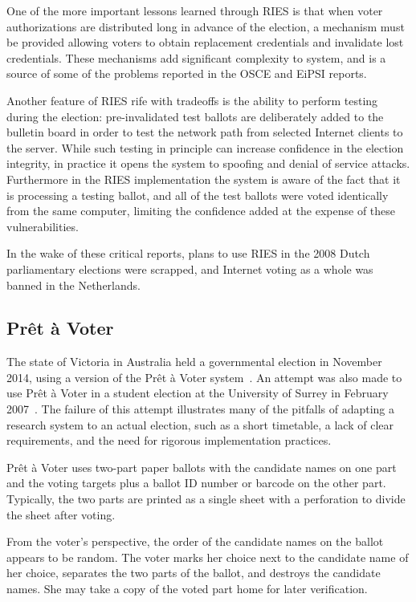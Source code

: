 One of the more important lessons learned through RIES is that when
voter authorizations are distributed long in advance of the election,
a mechanism must be provided allowing voters to obtain replacement
credentials and invalidate lost credentials. These mechanisms add
significant complexity to system, and is a source of some of the
problems reported in the OSCE and EiPSI reports.

Another feature of RIES rife with tradeoffs is the ability to perform
testing during the election: pre-invalidated test ballots are
deliberately added to the bulletin board in order to test the network
path from selected Internet clients to the server. While such testing
in principle can increase confidence in the election integrity, in
practice it opens the system to spoofing and denial of service
attacks. Furthermore in the RIES implementation the system is aware of
the fact that it is processing a testing ballot, and all of the test
ballots were voted identically from the same computer, limiting the
confidence added at the expense of these vulnerabilities.

In the wake of these critical reports, plans to use RIES in the 2008
Dutch parliamentary elections were scrapped, and Internet voting as a
whole was banned in the Netherlands.

\subsection{Prêt à Voter}
\label{sec:pret-voter}

The state of Victoria in Australia held a governmental election in
November 2014, using a version of the Prêt à Voter
system~\cite{chaum2005, burton2012}. An attempt was also made to use
Prêt à Voter in a student election at the University of Surrey in
February 2007~\cite{bismark2007}. The failure of this attempt
illustrates many of the pitfalls of adapting a research system to an
actual election, such as a short timetable, a lack of clear
requirements, and the need for rigorous implementation practices.

Prêt à Voter uses two-part paper ballots with the candidate names on
one part and the voting targets plus a ballot ID number or barcode on
the other part. Typically, the two parts are printed as a single sheet
with a perforation to divide the sheet after voting.

From the voter's perspective, the order of the candidate names on the
ballot appears to be random. The voter marks her choice next to the
candidate name of her choice, separates the two parts of the ballot,
and destroys the candidate names. She may take a copy of the voted
part home for later verification.

